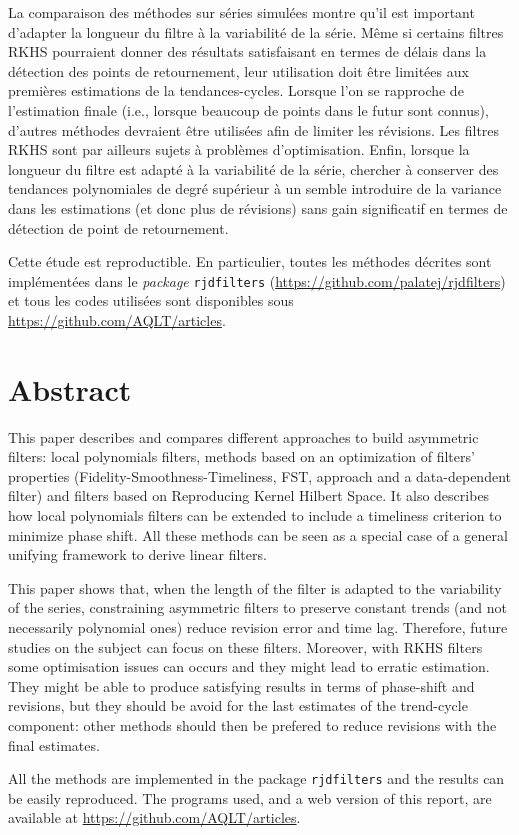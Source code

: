 La comparaison des méthodes sur séries simulées montre qu'il est
important d'adapter la longueur du filtre à la variabilité de la série.
Même si certains filtres RKHS pourraient donner des résultats
satisfaisant en termes de délais dans la détection des points de
retournement, leur utilisation doit être limitées aux premières
estimations de la tendances-cycles. Lorsque l'on se rapproche de
l'estimation finale (i.e., lorsque beaucoup de points dans le futur sont
connus), d'autres méthodes devraient être utilisées afin de limiter les
révisions. Les filtres RKHS sont par ailleurs sujets à problèmes
d'optimisation. Enfin, lorsque la longueur du filtre est adapté à la
variabilité de la série, chercher à conserver des tendances polynomiales
de degré supérieur à un semble introduire de la variance dans les
estimations (et donc plus de révisions) sans gain significatif en termes
de détection de point de retournement.

Cette étude est reproductible. En particulier, toutes les méthodes
décrites sont implémentées dans le \emph{package} 
\texttt{rjdfilters} (\url{https://github.com/palatej/rjdfilters}) et
tous les codes utilisées sont disponibles sous
\url{https://github.com/AQLT/articles}.

\hypertarget{abstract}{%
\section*{Abstract}\label{abstract}}

This paper describes and compares different approaches to build
asymmetric filters: local polynomials filters, methods based on an
optimization of filters' properties (Fidelity-Smoothness-Timeliness,
FST, approach and a data-dependent filter) and filters based on
Reproducing Kernel Hilbert Space. It also describes how local
polynomials filters can be extended to include a timeliness criterion to
minimize phase shift. All these methods can be seen as a special case of
a general unifying framework to derive linear filters.

This paper shows that, when the length of the filter is adapted to the
variability of the series, constraining asymmetric filters to preserve
constant trends (and not necessarily polynomial ones) reduce revision
error and time lag. Therefore, future studies on the subject can focus
on these filters. Moreover, with RKHS filters some optimisation issues
can occurs and they might lead to erratic estimation. They might be able
to produce satisfying results in terms of phase-shift and revisions, but
they should be avoid for the last estimates of the trend-cycle
component: other methods should then be prefered to reduce revisions
with the final estimates.

All the methods are implemented in the  package
\texttt{rjdfilters} and the results can be easily reproduced. The
programs used, and a web version of this report, are available at
\url{https://github.com/AQLT/articles}.
